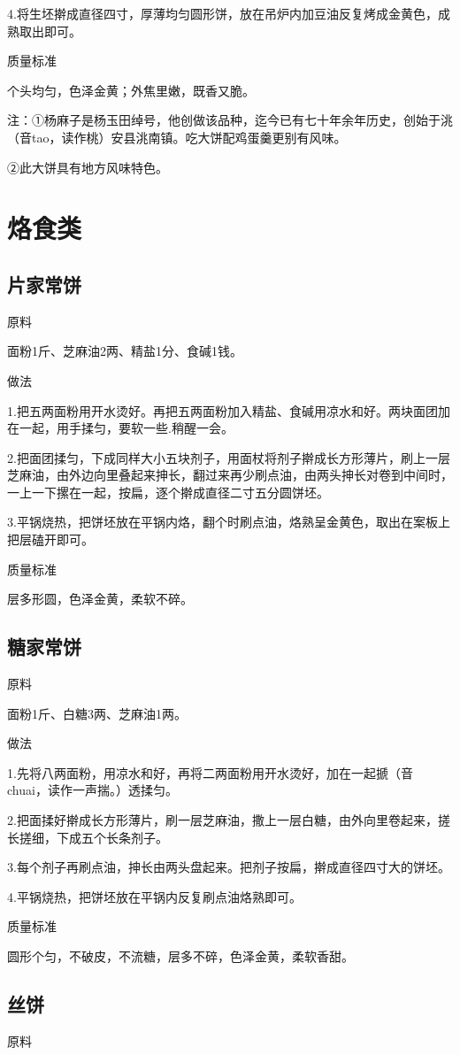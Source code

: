 \documentclass{ctexbook}
\begin{document}
4.将生坯擀成直径四寸，厚薄均匀圆形饼，放在吊炉内加豆油反复烤成金黄色，成熟取出即可。

质量标准

个头均匀，色泽金黄；外焦里嫩，既香又脆。

注：①杨麻子是杨玉田绰号，他创做该品种，迄今已有七十年余年历史，创始于洮（音tao，读作桃）安县洮南镇。吃大饼配鸡蛋羹更别有风味。

②此大饼具有地方风味特色。
\section{烙食类}
\subsection{片家常饼}
原料

面粉1斤、芝麻油2两、精盐1分、食碱1钱。

做法

1.把五两面粉用开水烫好。再把五两面粉加入精盐、食碱用凉水和好。两块面团加在一起，用手揉匀，要软一些.稍醒一会。

2.把面团揉匀，下成同样大小五块剂子，用面杖将剂子擀成长方形薄片，刷上一层芝麻油，由外边向里叠起来抻长，翻过来再少刷点油，由两头抻长对卷到中间时，一上一下摞在一起，按扁，逐个擀成直径二寸五分圆饼坯。

3.平锅烧热，把饼坯放在平锅内烙，翻个时刷点油，烙熟呈金黄色，取出在案板上把层磕开即可。

质量标准

层多形圆，色泽金黄，柔软不碎。
\subsection{糖家常饼}
原料

面粉1斤、白糖3两、芝麻油1两。

做法

1.先将八两面粉，用凉水和好，再将二两面粉用开水烫好，加在一起搋（音chuai，读作一声揣。）透揉匀。

2.把面揉好擀成长方形薄片，刷一层芝麻油，撒上一层白糖，由外向里卷起来，搓长搓细，下成五个长条剂子。

3.每个剂子再刷点油，抻长由两头盘起来。把剂子按扁，擀成直径四寸大的饼坯。

4.平锅烧热，把饼坯放在平锅内反复刷点油烙熟即可。

质量标准

圆形个匀，不破皮，不流糖，层多不碎，色泽金黄，柔软香甜。
\subsection{丝饼}
原料
\end{document}
